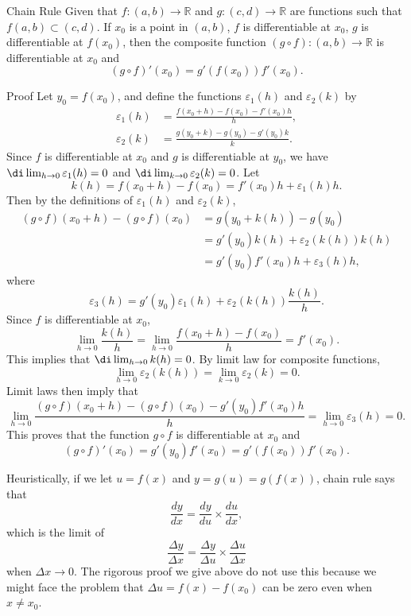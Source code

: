 \begin{theorem}{Chain Rule}
Given that  $f:(a,b)\to \mathbb{R}$ and $g:(c,d)\to\mathbb{R}$ are  functions such that $f(a,b)\subset (c,d)$. If $x_0$ is a point in $(a,b)$, $f$ is differentiable at $x_0$, $g$ is differentiable at $f(x_0)$, then the composite function $ (g\circ f):(a, b)\to \mathbb{R}$ is differentiable at $x_0$ and 
\[(g\circ f)'(x_0)=g'(f(x_0))f'(x_0).\]

\end{theorem}
\begin{myproof}{Proof}
Let  $y_0=f(x_0)$, and define the functions $\varepsilon_1(h)$ and $\varepsilon_2(k)$ by
\begin{align*}
\varepsilon_1(h)&=\frac{f(x_0+h)-f(x_0)-f'(x_0)h}{h},\\
\varepsilon_2(k)&=\frac{g(y_0+k)-g(y_0)-g'(y_0)k}{k}.
\end{align*}Since $f$ is differentiable at $x_0$ and $g$ is differentiable at $y_0$, we have
$\di\lim_{h\to 0}\varepsilon_1(h)=0$ and $\di \lim_{k\to 0}\varepsilon_2(k)=0$.
Let
\[k(h)=f(x_0+h)-f(x_0)=f'(x_0)h+\varepsilon_1(h)h.\] Then by the definitions of $\varepsilon_1(h)$ and $\varepsilon_2(k)$,
\begin{align*}
(g\circ f)(x_0+h)-(g\circ f)(x_0)&=g(y_0+k(h))-g(y_0)\\
&=g'(y_0)k(h)+\varepsilon_2(k(h))k(h)\\
&=g'(y_0)f'(x_0)h+\varepsilon_3(h)h,
\end{align*}\bp
where 
\[\varepsilon_3(h)=g'(y_0)\varepsilon_1(h)+\varepsilon_2(k(h))\frac{k(h)}{h}.\]
Since $f$ is differentiable at $x_0$, \[\lim_{h\to 0}\frac{k(h)}{h}=\lim_{h\to 0}\frac{f(x_0+h)-f(x_0)}{h}=f'(x_0).\] This implies that $\di\lim_{h\rightarrow 0}k(h) =0$. By limit law  for composite functions,
\[\lim_{h\to 0}\varepsilon_2(k(h))=\lim_{k\to 0}\varepsilon_2(k)=0.\]
Limit laws then imply that
\[\lim_{h\to 0}\frac{(g\circ f)(x_0+h)-(g\circ f)(x_0)-g'(y_0)f'(x_0)h}{h}=\lim_{h\to 0}\varepsilon_3(h)=0.\]
This proves that the function $g\circ f$ is differentiable at $x_0$ and 
\[(g\circ f)'(x_0)=g'(y_0)f'(x_0)=g'(f(x_0))f'(x_0).\]
\end{myproof}
Heuristically, if we let $u=f(x)$ and $y=g(u)=g(f(x))$,   chain rule says that
\[\frac{dy}{dx}=\frac{dy}{du}\times\frac{du}{dx},\]
which is the limit of 
\[\frac{\Delta y}{\Delta x}=\frac{\Delta y}{\Delta u}\times\frac{\Delta u}{\Delta x}\]when $\Delta x\to 0$.
The rigorous proof we give above do not use this because we might face the problem that $\Delta u=f(x)-f(x_0)$ can be zero even when $x\neq x_0$. 

